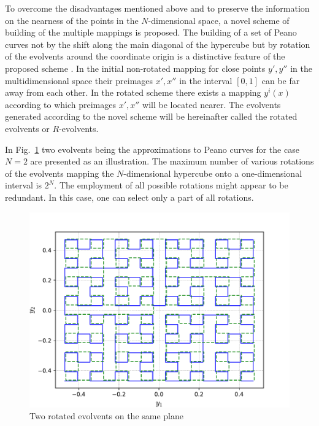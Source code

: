 \documentclass[runningheads]{llncs}
\begin{document}
To overcome the disadvantages mentioned above and to preserve the information on the nearness of the points in the $N$-dimensional space, a novel scheme of building of the multiple mappings is proposed. The building of a set of Peano curves not by the shift along the main diagonal of the hypercube but by rotation of the evolvents around the coordinate origin is a distinctive feature of the proposed scheme \cite{Gergel2009}. In the initial non-rotated mapping for close points $y', y''$ in the multidimensional space their preimages  $x', x''$ in the interval $[0,1]$ can be far away from each other. In the rotated scheme there exists a mapping $y^i(x)$ according to which preimages $x', x''$ will be located nearer. The evolvents generated according to the novel scheme will be hereinafter called the rotated evolvents or $R$-evolvents.

In Fig.~\ref{6_fig_9} two evolvents being the approximations to Peano curves for the case $N=2$ are presented as an illustration. The maximum number of various rotations of the evolvents mapping the $N$-dimensional hypercube onto a one-dimensional interval is $2^N$. The employment of all possible rotations might appear to be redundant. In this case, one can select only a part of all rotations.

\begin{figure}[t]
  \centering
  \includegraphics[width=0.8\linewidth]{pictures/rotated_1.pdf}
  \caption{Two rotated evolvents on the same plane}
  \label{6_fig_9}
\end{figure}
\end{document}

